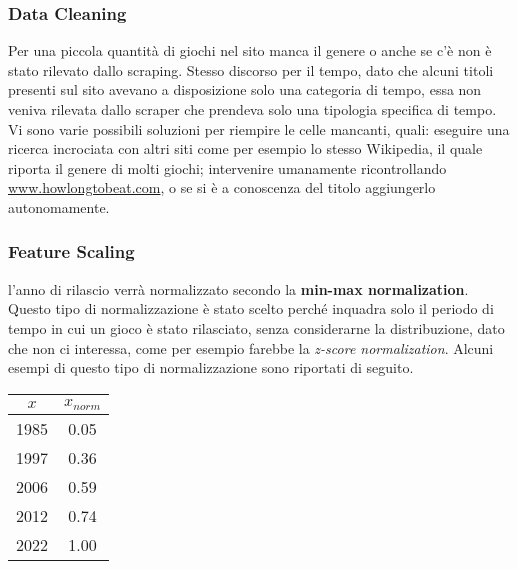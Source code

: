         \subsubsection{Data Cleaning}
            Per una piccola quantità di giochi nel sito manca il genere o anche se c'è non è stato rilevato dallo scraping. Stesso discorso per il tempo, dato che alcuni titoli presenti sul sito avevano a disposizione solo una categoria di tempo, essa non veniva rilevata dallo scraper che prendeva solo una tipologia specifica di tempo. Vi sono varie possibili soluzioni per riempire le celle mancanti, quali: eseguire una ricerca incrociata con altri siti come per esempio lo stesso Wikipedia, il quale riporta il genere di molti giochi; intervenire umanamente ricontrollando \url{www.howlongtobeat.com}, o se si è a conoscenza del titolo aggiungerlo autonomamente.
            
        \subsubsection{Feature Scaling}
           l'anno di rilascio verrà normalizzato secondo la \textbf{min-max normalization}. Questo tipo di normalizzazione è stato scelto perché inquadra solo il periodo di tempo in cui un gioco è stato rilasciato, senza considerarne la distribuzione, dato che non ci interessa, come per esempio farebbe la \textit{z-score normalization}. Alcuni esempi di questo tipo di normalizzazione sono riportati di seguito.
            \begin{center}
                \begin{tabular}{|c|c|}
                \hline
                $x$  & $x_{norm}$ \\ \hline
                1985 & 0.05     \\ \hline
                1997 & 0.36     \\ \hline
                2006 & 0.59     \\ \hline
                2012 & 0.74     \\ \hline
                2022 & 1.00     \\ \hline
                \end{tabular}
            \end{center}
        
